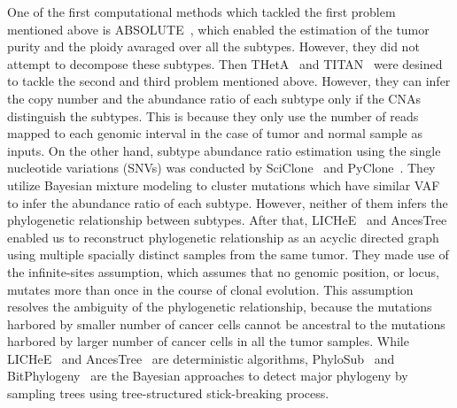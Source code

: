 \documentclass{article}
\begin{document}
One of the first computational methods which tackled the first problem mentioned above is ABSOLUTE~\cite{carter2012absolute}, which enabled the estimation of the tumor purity and the ploidy avaraged over all the subtypes.
However, they did not attempt to decompose these subtypes.
Then THetA~\cite{williams2016identification} and TITAN~\cite{ha2014titan} were desined to tackle the second and third problem mentioned above.
However, they can infer the copy number and the abundance ratio of each subtype only if the CNAs distinguish the subtypes.%
This is because they only use the number of reads mapped to each genomic interval in the case of tumor and normal sample as inputs.
On the other hand, subtype abundance ratio estimation using the single nucleotide variations (SNVs) was conducted by SciClone~\cite{miller2014sciclone} and PyClone~\cite{roth2014pyclone}.
They utilize Bayesian mixture modeling to cluster mutations which have similar VAF to infer the abundance ratio of each subtype.
However, neither of them infers the phylogenetic relationship between subtypes.
After that, LICHeE~\cite{popic2015fast} and AncesTree~\cite{el2015reconstruction} enabled us to reconstruct phylogenetic relationship as an acyclic directed graph using multiple spacially distinct samples from the same tumor.
They made use of the infinite-sites assumption, which assumes that no genomic position, or locus, mutates more than once in the course of clonal evolution.
This assumption resolves the ambiguity of the phylogenetic relationship, because the mutations harbored by smaller number of cancer cells cannot be ancestral to the mutations harbored by larger number of cancer cells in all the tumor samples.
While LICHeE~\cite{popic2015fast} and AncesTree~\cite{el2015reconstruction} are deterministic algorithms, PhyloSub~\cite{jiao2014inferring} and BitPhylogeny~\cite{yuan2015bitphylogeny} are the Bayesian approaches to detect major phylogeny by sampling trees using tree-structured stick-breaking process.
\end{document}
